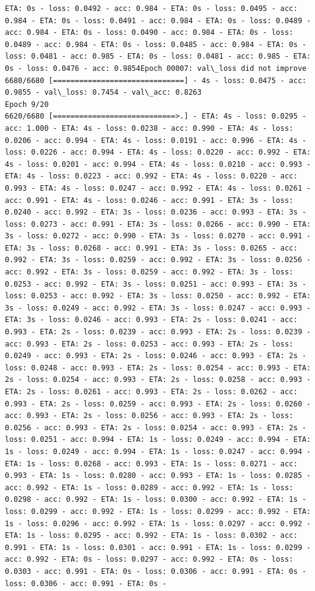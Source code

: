 \documentclass[11pt]{article}
\begin{document}
\begin{Verbatim}[commandchars=\\\{\}]
ETA: 0s - loss: 0.0492 - acc: 0.984 - ETA: 0s - loss: 0.0495 - acc: 0.984 - ETA: 0s - loss: 0.0491 - acc: 0.984 - ETA: 0s - loss: 0.0489 - acc: 0.984 - ETA: 0s - loss: 0.0490 - acc: 0.984 - ETA: 0s - loss: 0.0489 - acc: 0.984 - ETA: 0s - loss: 0.0485 - acc: 0.984 - ETA: 0s - loss: 0.0481 - acc: 0.985 - ETA: 0s - loss: 0.0481 - acc: 0.985 - ETA: 0s - loss: 0.0476 - acc: 0.9854Epoch 00007: val\_loss did not improve
6680/6680 [==============================] - 4s - loss: 0.0475 - acc: 0.9855 - val\_loss: 0.7454 - val\_acc: 0.8263
Epoch 9/20
6620/6680 [============================>.] - ETA: 4s - loss: 0.0295 - acc: 1.000 - ETA: 4s - loss: 0.0238 - acc: 0.990 - ETA: 4s - loss: 0.0206 - acc: 0.994 - ETA: 4s - loss: 0.0191 - acc: 0.996 - ETA: 4s - loss: 0.0226 - acc: 0.994 - ETA: 4s - loss: 0.0220 - acc: 0.992 - ETA: 4s - loss: 0.0201 - acc: 0.994 - ETA: 4s - loss: 0.0210 - acc: 0.993 - ETA: 4s - loss: 0.0223 - acc: 0.992 - ETA: 4s - loss: 0.0220 - acc: 0.993 - ETA: 4s - loss: 0.0247 - acc: 0.992 - ETA: 4s - loss: 0.0261 - acc: 0.991 - ETA: 4s - loss: 0.0246 - acc: 0.991 - ETA: 3s - loss: 0.0240 - acc: 0.992 - ETA: 3s - loss: 0.0236 - acc: 0.993 - ETA: 3s - loss: 0.0273 - acc: 0.991 - ETA: 3s - loss: 0.0266 - acc: 0.990 - ETA: 3s - loss: 0.0272 - acc: 0.990 - ETA: 3s - loss: 0.0270 - acc: 0.991 - ETA: 3s - loss: 0.0268 - acc: 0.991 - ETA: 3s - loss: 0.0265 - acc: 0.992 - ETA: 3s - loss: 0.0259 - acc: 0.992 - ETA: 3s - loss: 0.0256 - acc: 0.992 - ETA: 3s - loss: 0.0259 - acc: 0.992 - ETA: 3s - loss: 0.0253 - acc: 0.992 - ETA: 3s - loss: 0.0251 - acc: 0.993 - ETA: 3s - loss: 0.0253 - acc: 0.992 - ETA: 3s - loss: 0.0250 - acc: 0.992 - ETA: 3s - loss: 0.0249 - acc: 0.992 - ETA: 3s - loss: 0.0247 - acc: 0.993 - ETA: 3s - loss: 0.0246 - acc: 0.993 - ETA: 2s - loss: 0.0241 - acc: 0.993 - ETA: 2s - loss: 0.0239 - acc: 0.993 - ETA: 2s - loss: 0.0239 - acc: 0.993 - ETA: 2s - loss: 0.0253 - acc: 0.993 - ETA: 2s - loss: 0.0249 - acc: 0.993 - ETA: 2s - loss: 0.0246 - acc: 0.993 - ETA: 2s - loss: 0.0248 - acc: 0.993 - ETA: 2s - loss: 0.0254 - acc: 0.993 - ETA: 2s - loss: 0.0254 - acc: 0.993 - ETA: 2s - loss: 0.0258 - acc: 0.993 - ETA: 2s - loss: 0.0261 - acc: 0.993 - ETA: 2s - loss: 0.0262 - acc: 0.993 - ETA: 2s - loss: 0.0259 - acc: 0.993 - ETA: 2s - loss: 0.0260 - acc: 0.993 - ETA: 2s - loss: 0.0256 - acc: 0.993 - ETA: 2s - loss: 0.0256 - acc: 0.993 - ETA: 2s - loss: 0.0254 - acc: 0.993 - ETA: 2s - loss: 0.0251 - acc: 0.994 - ETA: 1s - loss: 0.0249 - acc: 0.994 - ETA: 1s - loss: 0.0249 - acc: 0.994 - ETA: 1s - loss: 0.0247 - acc: 0.994 - ETA: 1s - loss: 0.0268 - acc: 0.993 - ETA: 1s - loss: 0.0271 - acc: 0.993 - ETA: 1s - loss: 0.0280 - acc: 0.993 - ETA: 1s - loss: 0.0285 - acc: 0.992 - ETA: 1s - loss: 0.0289 - acc: 0.992 - ETA: 1s - loss: 0.0298 - acc: 0.992 - ETA: 1s - loss: 0.0300 - acc: 0.992 - ETA: 1s - loss: 0.0299 - acc: 0.992 - ETA: 1s - loss: 0.0299 - acc: 0.992 - ETA: 1s - loss: 0.0296 - acc: 0.992 - ETA: 1s - loss: 0.0297 - acc: 0.992 - ETA: 1s - loss: 0.0295 - acc: 0.992 - ETA: 1s - loss: 0.0302 - acc: 0.991 - ETA: 1s - loss: 0.0301 - acc: 0.991 - ETA: 1s - loss: 0.0299 - acc: 0.992 - ETA: 0s - loss: 0.0297 - acc: 0.992 - ETA: 0s - loss: 0.0303 - acc: 0.991 - ETA: 0s - loss: 0.0306 - acc: 0.991 - ETA: 0s - loss: 0.0306 - acc: 0.991 - ETA: 0s - 
\end{Verbatim}
\end{document}
